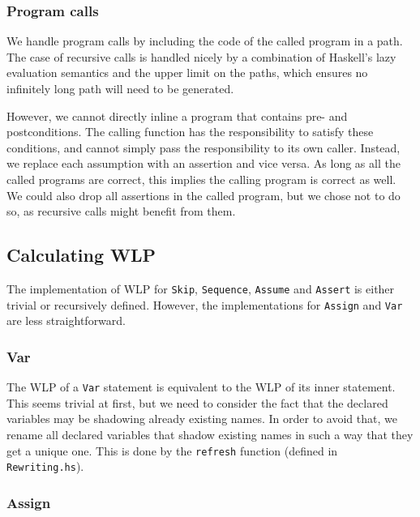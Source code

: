 \documentclass[a4paper]{article}
\begin{document}
\subsubsection*{Program calls}

We handle program calls by including the code of the called program in a path.
The case of recursive calls is handled nicely by a combination of Haskell's
lazy evaluation semantics and the upper limit on the paths, which ensures no
infinitely long path will need to be generated.

However, we cannot directly inline a program that contains pre- and
postconditions. The calling function has the responsibility to satisfy these
conditions, and cannot simply pass the responsibility to its own caller.
Instead, we replace each assumption with an assertion and vice versa. As long
as all the called programs are correct, this implies the calling program is
correct as well. We could also drop all assertions in the called program, but
we chose not to do so, as recursive calls might benefit from them.

\subsection{Calculating WLP}

The implementation of WLP for \texttt{Skip}, \texttt{Sequence}, \texttt{Assume}
and \texttt{Assert} is either trivial or recursively defined. However, the
implementations for \texttt{Assign} and \texttt{Var} are less straightforward.

\subsubsection*{Var}

The WLP of a \texttt{Var} statement is equivalent to the WLP of its inner statement.
This seems trivial at first, but we need to consider the fact that the declared
variables may be shadowing already existing names. In order to avoid that, we
rename all declared variables that shadow existing names in such a way that they get
a unique one. This is done by the \texttt{refresh} function (defined in \texttt{Rewriting.hs}).


\subsubsection*{Assign}
\end{document}
